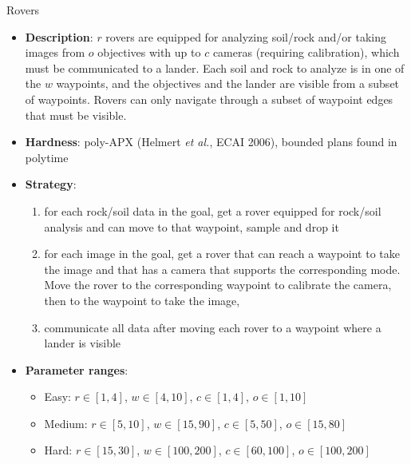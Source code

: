 \documentclass[aspectratio=169,xcolor=dvipsnames]{beamer}
\begin{document}
\begin{frame}{Rovers}

    \begin{itemize}
        \item \textbf{Description}: $r$ rovers are equipped for analyzing soil/rock and/or taking images from $o$ objectives with up to $c$ cameras (requiring calibration), which must be communicated to a lander. Each soil and rock to analyze is in one of the $w$ waypoints, and the objectives and the lander are visible from a subset of waypoints. Rovers can only navigate through a subset of waypoint edges that must be visible.
        \item \textbf{Hardness}: poly-APX (Helmert \textit{et al.}, ECAI 2006), bounded plans found in polytime
        \item \textbf{Strategy}:
        \begin{enumerate}
            \item for each rock/soil data in the goal, get a rover equipped for rock/soil analysis and can move to that waypoint, sample and drop it
            \item for each image in the goal, get a rover that can reach a waypoint to take the image and that has a camera that supports the corresponding mode. Move the rover to the corresponding waypoint to calibrate the camera, then to the waypoint to take the image,
            \item communicate all data after moving each rover to a waypoint where a lander is visible
        \end{enumerate}
        \item \textbf{Parameter ranges}:
        \begin{itemize}
            \item Easy: $r\in[1, 4]$, $w\in[4, 10]$, $c\in[1, 4]$, $o\in[1, 10]$
            \item Medium: $r\in[5, 10]$, $w\in[15, 90]$, $c\in[5, 50]$, $o\in[15, 80]$
            \item Hard: $r\in[15, 30]$, $w\in[100, 200]$, $c\in[60, 100]$, $o\in[100, 200]$
        \end{itemize}
    \end{itemize}

\end{frame}
\end{document}
